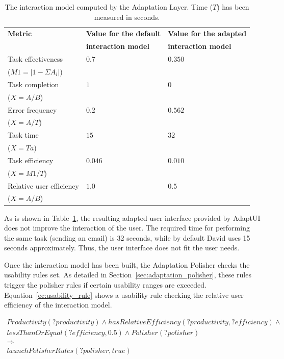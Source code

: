 \begin{table}
 \caption{The interaction model computed by the Adaptation Layer. Time ($T$) has
 been measured in seconds.}
 \label{tbl:model_comparison}
 \footnotesize
 \centering
\begin{tabular}{l l l}
  \hline 
  \textbf{Metric} 	& \textbf{Value for the default}& \textbf{Value for the adapted}\\
			& \textbf{interaction model} 	& \textbf{interaction model}	\\
  \hline
  Task effectiveness	& $0.7$				& $0.350$	\\
  ($M1=|1-\Sigma A_{i}|$)\\
  Task completion	& $1$				& $0$		\\
  ($X=A/B$)\\
  Error frequency 	& $0.2$				& $0.562$	\\	%
  ($X=A/T$)\\
  \hline
  Task time		& $15$				& $32$		\\
  ($X=Ta$)\\
  Task efficiency 	& $0.046$			& $0.010$	\\
  ($X=M1/T$)\\
  Relative user efficiency & $1.0$			& $0.5$		\\
  ($X=A/B$)\\
  \hline
\end{tabular}
\end{table}

As is shown in Table~\ref{tbl:model_comparison}, the resulting adapted user 
interface provided by AdaptUI does not improve the interaction of the user.
The required time for performing the same task (sending an email) is 32 seconds,
while by default David uses 15 seconds approximately. Thus, the user interface
does not fit the user needs. 

Once the interaction model has been built, the Adaptation Polisher checks the
usability rules set. As detailed in Section~\ref{sec:adaptation_polisher}, these
rules trigger the polisher rules if certain usability ranges are exceeded.
Equation~\ref{ec:usability_rule} shows a usability rule checking the relative
user efficiency of the interaction model.

\footnotesize
\begin{equation} \label{ec:usability_rule}
  \begin{align*} 
  Productivity(?productivity) ∧ hasRelativeEfficiency(?productivity, ?efficiency) ∧\\
  lessThanOrEqual(?efficiency, 0.5) ∧ Polisher(?polisher)\\
  \Rightarrow \\
  launchPolisherRules(?polisher, true)
  \end{align*}
\end{equation}
\normalsize

